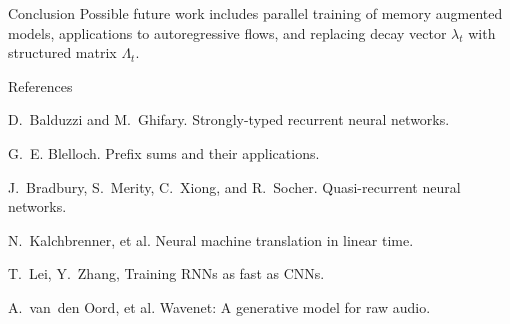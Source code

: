 \documentclass[final]{beamer}
\newlength{\onecolwid}
\begin{document}
\begin{frame}[t]
\begin{columns}[t]
\begin{column}{\onecolwid}
\begin{block}{Conclusion}
\vspace{1ex}
Possible future work includes parallel training of memory augmented models, applications
to autoregressive flows, and replacing decay vector $\lambda_t$ with structured matrix
$\Lambda_t$.

\end{block}



\begin{block}{References}

\nocite{*} %
\small{}
D.~Balduzzi and M.~Ghifary.
Strongly-typed recurrent neural networks.

G.~E. Blelloch.
Prefix sums and their applications.

J.~Bradbury, S.~Merity, C.~Xiong, and R.~Socher.
Quasi-recurrent neural networks.

N.~Kalchbrenner, et al.
Neural machine translation in linear time.

T.~Lei, Y.~Zhang,
Training RNNs as fast as CNNs.

A.~van~den Oord, et al.
Wavenet: A generative model for raw audio.

\end{block}



\end{column} %

\end{columns} %

\end{frame} %
\end{document}
